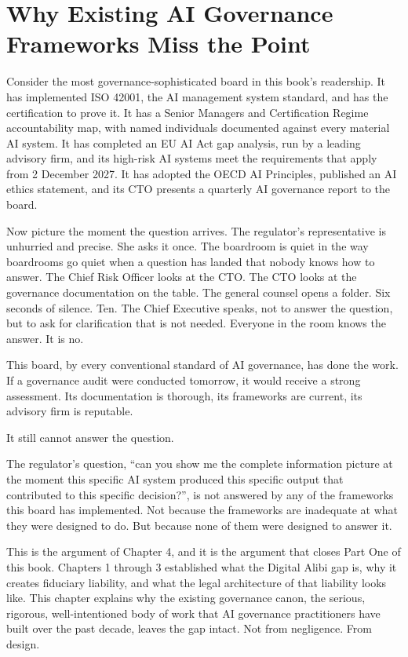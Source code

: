 
\chapter{Why Existing AI Governance Frameworks Miss the Point}

Consider the most governance-sophisticated board in this book's readership. It has implemented ISO 42001, the AI management system standard, and has the certification to prove it. It has a Senior Managers and Certification Regime accountability map, with named individuals documented against every material AI system. It has completed an EU AI Act gap analysis, run by a leading advisory firm, and its high-risk AI systems meet the requirements that apply from 2 December 2027. It has adopted the OECD AI Principles, published an AI ethics statement, and its CTO presents a quarterly AI governance report to the board.

Now picture the moment the question arrives. The regulator's representative is unhurried and precise. She asks it once. The boardroom is quiet in the way boardrooms go quiet when a question has landed that nobody knows how to answer. The Chief Risk Officer looks at the CTO. The CTO looks at the governance documentation on the table. The general counsel opens a folder. Six seconds of silence. Ten. The Chief Executive speaks, not to answer the question, but to ask for clarification that is not needed. Everyone in the room knows the answer. It is no.

This board, by every conventional standard of AI governance, has done the work. If a governance audit were conducted tomorrow, it would receive a strong assessment. Its documentation is thorough, its frameworks are current, its advisory firm is reputable.

It still cannot answer the question.

The regulator's question, ``can you show me the complete information picture at the moment this specific AI system produced this specific output that contributed to this specific decision?'', is not answered by any of the frameworks this board has implemented. Not because the frameworks are inadequate at what they were designed to do. But because none of them were designed to answer it.

This is the argument of Chapter 4, and it is the argument that closes Part One of this book. Chapters 1 through 3 established what the Digital Alibi gap is, why it creates fiduciary liability, and what the legal architecture of that liability looks like. This chapter explains why the existing governance canon, the serious, rigorous, well-intentioned body of work that AI governance practitioners have built over the past decade, leaves the gap intact. Not from negligence. From design.

